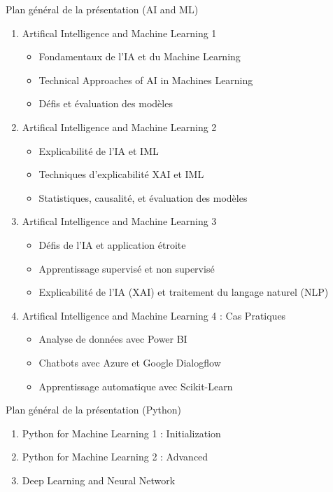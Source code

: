 \documentclass{beamer}
\begin{document}
\begin{frame}{Plan général de la présentation (AI and ML)}
	\begin{enumerate}
		\item Artifical Intelligence and Machine Learning 1
		\begin{itemize}
			\item Fondamentaux de l'IA et du Machine Learning
			\item Technical Approaches of AI in Machines Learning 
			\item Défis et évaluation des modèles 
		\end{itemize}
		\item Artifical Intelligence and Machine Learning 2
		\begin{itemize}
			\item Explicabilité de l'IA et IML
			\item Techniques d'explicabilité XAI et IML 
			\item Statistiques, causalité, et évaluation des modèles
		\end{itemize}
		\item Artifical Intelligence and Machine Learning 3
		\begin{itemize}
			\item Défis de l'IA et application étroite
			\item Apprentissage supervisé et non supervisé
			\item Explicabilité de l'IA (XAI) et traitement du langage naturel (NLP) 
		\end{itemize}
		\item Artifical Intelligence and Machine Learning 4 : Cas Pratiques
		\begin{itemize}
			\item Analyse de données avec Power BI 
			\item Chatbots avec Azure et Google Dialogflow
			\item Apprentissage automatique avec Scikit-Learn 
		\end{itemize}
	\end{enumerate}	
\end{frame}

\begin{frame}{Plan général de la présentation (Python)}
\begin{enumerate}
	\item Python for Machine Learning 1 : Initialization
	\item Python for Machine Learning 2 : Advanced
	\item Deep Learning and Neural Network
\end{enumerate}
\end{frame}
\end{document}
